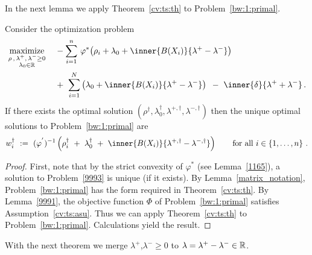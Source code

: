 %
In the next lemma we apply Theorem~\ref{cv:ts:th} to Problem~\ref{bw:1:primal}.
%
\begin{lemma}
  Consider the optimization problem
\begin{align}
  \label{9993}
  \begin{split}
  \underset
  {\begin{smallmatrix}
\rho\,,\, \lambda^+,\,\lambda^-\ge 0 \\
\lambda_0\in\R
  \end{smallmatrix}}
  {
    \mathrm{maximize}
  }
  \quad
  &
  -
\sum_{i=1} 
  ^n
    \,
  \varphi^*
  \!
  \left( 
    \rho_i
    +
\lambda_0
+
\inner
{B(X_i)}
{
\lambda^+
-
\lambda^-
}
  \right)
  \\
  &
+
\ 
\sum_{i=1}^{N} 
  \left( 
\lambda_0
+
\inner
{B(X_i)}
{
\lambda^+
-
\lambda^-
}
  \right)
  \,
  \ 
-
\ 
\inner
{\delta}
{
\lambda^+
+
\lambda^-
}
  \,.
  \end{split}
\end{align}
If there exists the optimal solution 
$
(\rho^\dagger,\lambda_0^\dagger,\lambda^{+,\dagger},\lambda^{-,\dagger})
$
then the unique optimal solutions to Problem~\ref{bw:1:primal} are 
\begin{gather*}
  w^\dagger_i
  \ 
  :=
  \ 
  (
  \varphi^{'}
  )^{-1}
  \left(
    \rho^\dagger_i
  \ 
    +
  \ 
\lambda_0^\dagger
  \ 
+
  \ 
\inner
{B(X_i)}
{
  \lambda^{+,\dagger}
-
\lambda^{-,\dagger}
}
  \right)
  \qquad
  \text{for all}\ 
  i\in
  \left\{ 1,\ldots,n \right\}
  \,.
\end{gather*}
\end{lemma}
\begin{proof}
  First, note that by the strict convexity of $\varphi^*$ (see Lemma~\ref{1165}), a solution to Problem~\eqref{9993}
  is unique (if it exists).
  By Lemma~\ref{matrix_notation},
  Problem~\ref{bw:1:primal} has the form required in Theorem~\ref{cv:ts:th}.
  By Lemma~\ref{9991}, the objective function $\Phi$ of Problem~\ref{bw:1:primal}
  satisfies Assumption~\ref{cv:ts:asu}.
  Thus we can apply
  Theorem~\ref{cv:ts:th} to Problem~\ref{bw:1:primal}.
  Calculations yield the result.
\end{proof}
With the next theorem we merge $\lambda^{+}$,$\lambda^{-}\ge 0$ to 
$\lambda=\lambda^{+}-\lambda^{-}\in\mathbb{R}$.
